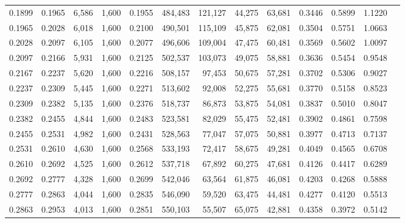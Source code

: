 \begin{tabular}{rrrrrrrrrrrrr}
0.1899 & 0.1965 &  6,586 & 1,600 &                                     0.1955 & 484,483 & 121,127 &  44,275 &  63,681 & 0.3446 & 0.5899 & 1.1220 \\
0.1965 & 0.2028 &  6,018 & 1,600 &                                     0.2100 & 490,501 & 115,109 &  45,875 &  62,081 & 0.3504 & 0.5751 & 1.0663 \\
0.2028 & 0.2097 &  6,105 & 1,600 &                                     0.2077 & 496,606 & 109,004 &  47,475 &  60,481 & 0.3569 & 0.5602 & 1.0097 \\
0.2097 & 0.2166 &  5,931 & 1,600 &                                     0.2125 & 502,537 & 103,073 &  49,075 &  58,881 & 0.3636 & 0.5454 & 0.9548 \\
0.2167 & 0.2237 &  5,620 & 1,600 &                                     0.2216 & 508,157 &  97,453 &  50,675 &  57,281 & 0.3702 & 0.5306 & 0.9027 \\
0.2237 & 0.2309 &  5,445 & 1,600 &                                     0.2271 & 513,602 &  92,008 &  52,275 &  55,681 & 0.3770 & 0.5158 & 0.8523 \\
0.2309 & 0.2382 &  5,135 & 1,600 &                                     0.2376 & 518,737 &  86,873 &  53,875 &  54,081 & 0.3837 & 0.5010 & 0.8047 \\
0.2382 & 0.2455 &  4,844 & 1,600 &                                     0.2483 & 523,581 &  82,029 &  55,475 &  52,481 & 0.3902 & 0.4861 & 0.7598 \\
0.2455 & 0.2531 &  4,982 & 1,600 &                                     0.2431 & 528,563 &  77,047 &  57,075 &  50,881 & 0.3977 & 0.4713 & 0.7137 \\
0.2531 & 0.2610 &  4,630 & 1,600 &                                     0.2568 & 533,193 &  72,417 &  58,675 &  49,281 & 0.4049 & 0.4565 & 0.6708 \\
0.2610 & 0.2692 &  4,525 & 1,600 &                                     0.2612 & 537,718 &  67,892 &  60,275 &  47,681 & 0.4126 & 0.4417 & 0.6289 \\
0.2692 & 0.2777 &  4,328 & 1,600 &                                     0.2699 & 542,046 &  63,564 &  61,875 &  46,081 & 0.4203 & 0.4268 & 0.5888 \\
0.2777 & 0.2863 &  4,044 & 1,600 &                                     0.2835 & 546,090 &  59,520 &  63,475 &  44,481 & 0.4277 & 0.4120 & 0.5513 \\
0.2863 & 0.2953 &  4,013 & 1,600 &                                     0.2851 & 550,103 &  55,507 &  65,075 &  42,881 & 0.4358 & 0.3972 & 0.5142 \\

\end{tabular}
